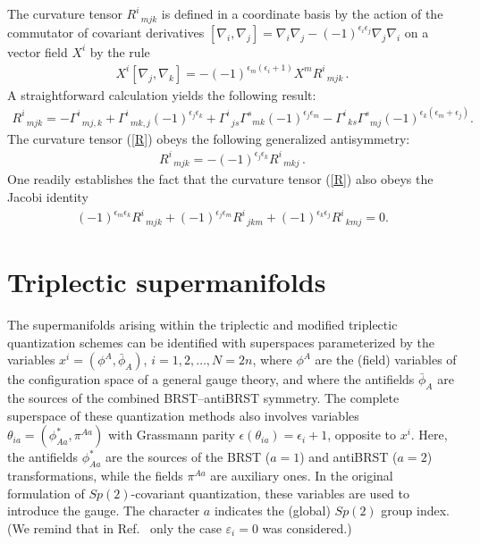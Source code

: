 \documentclass[a4paper,11pt]{article}
\begin{document}
The curvature tensor $R_{\;\;mjk}^{i}$ is defined in a coordinate
basis \cite {DeWitt} by the action of the commutator of covariant
derivatives $[\nabla _{i},\nabla _{j}]=\nabla _{i}\nabla
_{j}-(-1)^{\epsilon _{i}\epsilon _{j}}\nabla _{j}\nabla _{i}$ on a
vector field $X^{i}$ by the rule
\begin{eqnarray}
X^i[\nabla_j,\nabla_k]=-(-1)^{\epsilon_m(\epsilon_i+1)}
X^mR^i_{\;\;mjk}\,.
\end{eqnarray}
A straightforward calculation yields the following result:
\begin{eqnarray}
\label{R}
R^i_{\;\;mjk}=-\Gamma^i_{\;\;mj,k}+
\Gamma^i_{\;\;mk,j}(-1)^{\epsilon_j\epsilon_k}+
\Gamma^i_{\;\;js}\Gamma^s_{\;\;mk}(-1)^{\epsilon_j\epsilon_m}-
\Gamma^i_{\;\;ks}\Gamma^s_{\;\;mj}
(-1)^{\epsilon_k(\epsilon_m+\epsilon_j)}.
\end{eqnarray}
The curvature tensor (\ref{R}) obeys the following generalized
antisymmetry:
\begin{eqnarray}
\label{Rsym}
R^i_{\;\;mjk}=-(-1)^{\epsilon_j\epsilon_k}R^i_{\;\;mkj}\,.
\end{eqnarray}
One readily establishes the fact that the curvature tensor
(\ref{R}) also obeys the Jacobi identity
\begin{eqnarray}
\label{Rjac}
(-1)^{\epsilon_m\epsilon_k}R^i_{\;\;mjk}
+(-1)^{\epsilon_j\epsilon_m}R^i_{\;\;jkm}
+(-1)^{\epsilon_k\epsilon_j}R^i_{\;\;kmj}=0.
\end{eqnarray}

\section{Triplectic supermanifolds}

The supermanifolds arising within the triplectic \cite{3pl} and modified
triplectic \cite{mod3pl} quantization schemes can be identified with
superspaces parameterized by the variables $x^{i}=(\phi ^{A},\bar{\phi}_{A})$,
$i=1,2,\ldots,N=2n$, where $\phi ^{A}$ are the (field) variables of the
configuration space of a general gauge theory, and where the antifields $%
\bar{\phi}_{A}$ are the sources of the combined BRST--antiBRST symmetry. The
complete superspace of these quantization methods also involves variables $%
\theta _{ia}=(\phi _{Aa}^{\ast },\pi ^{Aa})$ with Grassmann parity $\epsilon
(\theta _{ia})=\epsilon _{i}+1$, opposite to $x^{i}$. Here, the antifields $%
\phi _{Aa}^{\ast }$ are the sources of the BRST ($a=1$) and antiBRST ($a=2$)
transformations, while the fields $\pi ^{Aa}$ are auxiliary ones. In the
original formulation of $Sp(2)$-covariant quantization, these variables are
used to introduce the gauge. The character $a$ indicates the (global)
$Sp(2)$
group index. (We remind that in Ref.~\cite{gln} only the case $\varepsilon
_{i}=0$ was considered.)
\end{document}
